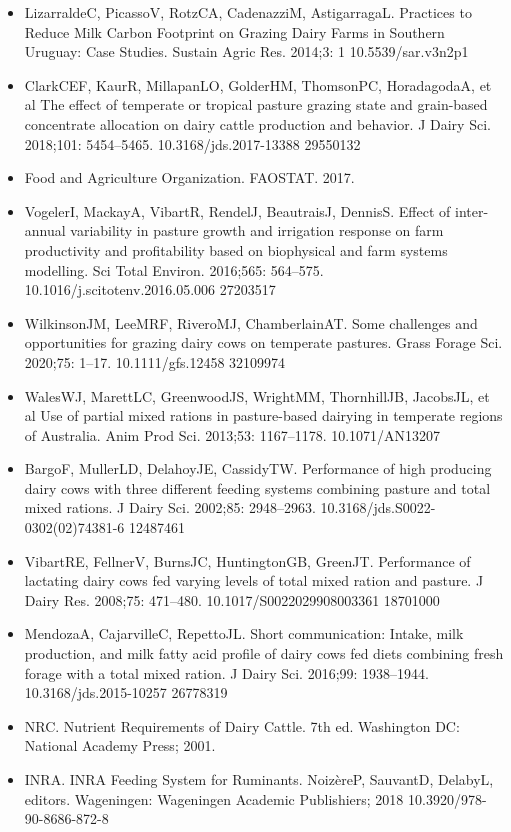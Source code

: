 \documentclass[11pt,a4paper]{article}
\begin{document}
\begin{itemize}
\item LizarraldeC, PicassoV, RotzCA, CadenazziM, AstigarragaL. Practices to Reduce Milk Carbon Footprint on Grazing Dairy Farms in Southern Uruguay: Case Studies. Sustain Agric Res. 2014;3: 1 10.5539/sar.v3n2p1
\item ClarkCEF, KaurR, MillapanLO, GolderHM, ThomsonPC, HoradagodaA, et al The effect of temperate or tropical pasture grazing state and grain-based concentrate allocation on dairy cattle production and behavior. J Dairy Sci. 2018;101: 5454–5465. 10.3168/jds.2017-13388 29550132
\item Food and Agriculture Organization. FAOSTAT. 2017.
\item VogelerI, MackayA, VibartR, RendelJ, BeautraisJ, DennisS. Effect of inter-annual variability in pasture growth and irrigation response on farm productivity and profitability based on biophysical and farm systems modelling. Sci Total Environ. 2016;565: 564–575. 10.1016/j.scitotenv.2016.05.006 27203517
\item WilkinsonJM, LeeMRF, RiveroMJ, ChamberlainAT. Some challenges and opportunities for grazing dairy cows on temperate pastures. Grass Forage Sci. 2020;75: 1–17. 10.1111/gfs.12458 32109974
\item WalesWJ, MarettLC, GreenwoodJS, WrightMM, ThornhillJB, JacobsJL, et al Use of partial mixed rations in pasture-based dairying in temperate regions of Australia. Anim Prod Sci. 2013;53: 1167–1178. 10.1071/AN13207
\item BargoF, MullerLD, DelahoyJE, CassidyTW. Performance of high producing dairy cows with three different feeding systems combining pasture and total mixed rations. J Dairy Sci. 2002;85: 2948–2963. 10.3168/jds.S0022-0302(02)74381-6 12487461
\item VibartRE, FellnerV, BurnsJC, HuntingtonGB, GreenJT. Performance of lactating dairy cows fed varying levels of total mixed ration and pasture. J Dairy Res. 2008;75: 471–480. 10.1017/S0022029908003361 18701000
\item MendozaA, CajarvilleC, RepettoJL. Short communication: Intake, milk production, and milk fatty acid profile of dairy cows fed diets combining fresh forage with a total mixed ration. J Dairy Sci. 2016;99: 1938–1944. 10.3168/jds.2015-10257 26778319
\item NRC. Nutrient Requirements of Dairy Cattle. 7th ed. Washington DC: National Academy Press; 2001.
\item INRA. INRA Feeding System for Ruminants. NoizèreP, SauvantD, DelabyL, editors. Wageningen: Wageningen Academic Publishiers; 2018 10.3920/978-90-8686-872-8

\end{itemize}
\end{document}
